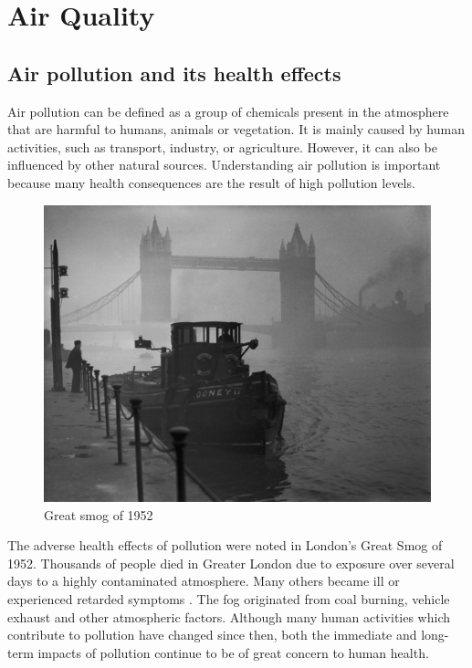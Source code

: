 \section{Air Quality}
\subsection{Air pollution and its health effects}
Air pollution can be defined as a group of chemicals present in the atmosphere that are harmful to humans, animals or vegetation. It is mainly caused by human activities, such as transport, industry, or agriculture. However, it can also be influenced by other natural sources. Understanding air pollution is important because many health consequences are the result of high pollution levels. 
\begin{figure}[h]
  \centering
  \includegraphics[scale=.8]{images/great_smog.jpg}
  \caption[Great smog of 1952]{Great smog of 1952 \cite{ElliotWagland2013}}
  \label{fig:interaction_design}
\end{figure}

The adverse health effects of pollution were noted in London's Great Smog of 1952. Thousands of people died in Greater London due to exposure over several days to a highly contaminated atmosphere. Many others became ill or experienced retarded symptoms \cite{Bell2008}. The fog originated from coal burning, vehicle exhaust and other atmospheric factors. Although many human activities which contribute to pollution have changed since then, both the immediate and long-term impacts of pollution continue to be of great concern to human health.


